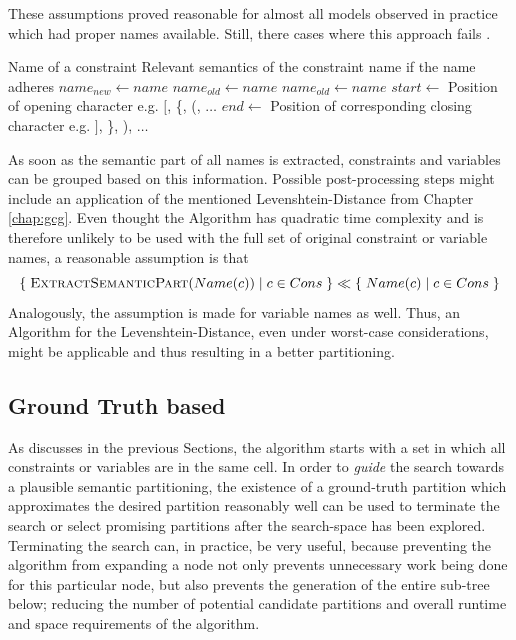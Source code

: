 			These assumptions proved reasonable for almost all models observed in practice which had proper names available. Still, there cases where this approach fails .
		
			\begin{algorithm}[ht!]
				\centering
				\begin{algorithmic}
					\Require Name of a constraint
					\Ensure Relevant semantics of the constraint name if the name adheres 
					\Statex
						\State ${name}_{new} \gets name$
						\State ${name}_{old} \gets name$
						\Repeat
							\State ${name}_{old} \gets name$
							\State $start \gets$ Position of opening character e.g. $\lbrack$, \{, (, $\ldots$
							\State $end \gets$ Position of corresponding closing character e.g. $\rbrack$, \}, ), $\ldots$
					\EndFunction
				\end{algorithmic}
				\caption{}
				\label{algo:tree:scoring:nameheur}
			\end{algorithm}
			
			As soon as the semantic part of all names is extracted, constraints and variables can be grouped based on this information.
			Possible post-processing steps might include an application of the mentioned Levenshtein-Distance from Chapter \ref{chap:gcg}.
			Even thought the Algorithm has quadratic time complexity and is therefore unlikely to be used with the full set of original constraint or variable names, a reasonable assumption is that
			\begin{equation*}
				\{ \; \Call{ExtractSemanticPart}{Name(c)} \mid c \in Cons \; \} \ll \{ \; Name(c) \mid c \in Cons \; \}
			\end{equation*}
			Analogously, the assumption is made for variable names as well.
			Thus, an Algorithm for the Levenshtein-Distance, even under worst-case considerations, might be applicable and thus resulting in a better partitioning.
			
			\clearpage
			

		\subsection{Ground Truth based}
		
			As discusses in the previous Sections, the algorithm starts with a set in which all constraints or variables are in the same cell.
			In order to \textit{guide} the search towards a plausible semantic partitioning, the existence of a ground-truth partition which approximates the desired partition reasonably well can be used to terminate the search or select promising partitions after the search-space has been explored.
			Terminating the search can, in practice, be very useful, because preventing the algorithm from expanding a node not only prevents unnecessary work being done for this particular node, but also prevents the generation of the entire sub-tree below; reducing the number of potential candidate partitions and overall runtime and space requirements of the algorithm.
			
